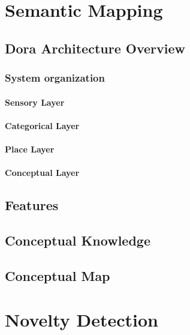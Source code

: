 \chapter{Semantic Mapping}\label{chap:semantic-mapping}

% 

\section{Dora Architecture Overview}
\subsection{System organization}
\subsubsection{Sensory Layer}
\subsubsection{Categorical Layer}
\subsubsection{Place Layer}
\subsubsection{Conceptual Layer}

\section{Features}
\section{Conceptual Knowledge}
\section{Conceptual Map}

\chapter{Novelty Detection}\label{chap:novelty-intro}
